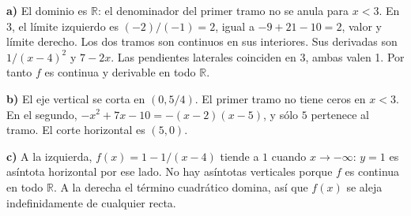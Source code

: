 \textbf{a)} El dominio es $\mathbb R$: el denominador del primer
tramo no se anula para $x<3$. En $3$, el límite izquierdo es
$(-2)/(-1)=2$, igual a $-9+21-10=2$, valor y límite derecho.
Los dos tramos son continuos en sus interiores.
Sus derivadas son $1/(x-4)^2$ y $7-2x$. Las pendientes laterales
coinciden en $3$, ambas valen 1. Por tanto $f$ es continua
y derivable en todo $\mathbb R$.

\textbf{b)} El eje vertical se corta en $(0,5/4)$.
El primer tramo no tiene ceros en $x<3$.
En el segundo, $-x^2+7x-10=-(x-2)(x-5)$, y sólo $5$
pertenece al tramo. El corte horizontal es $(5,0)$.

\textbf{c)} A la izquierda, $f(x)=1-1/(x-4)$ tiende a $1$
cuando $x\to-\infty$: $y=1$ es asíntota horizontal por ese lado.
No hay asíntotas verticales porque $f$ es continua en todo
$\mathbb R$. A la derecha el término cuadrático domina, así que
$f(x)$ se aleja indefinidamente de cualquier recta.
